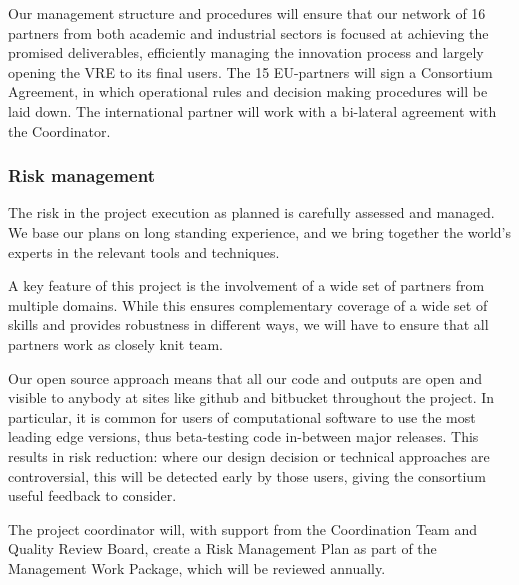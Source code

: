 Our management structure and procedures will ensure that our network
of 16 partners from both academic and industrial sectors is focused at
achieving the promised deliverables, efficiently managing the
innovation process and largely opening the VRE to its final users. The
15 EU-partners will sign a Consortium Agreement, in which operational
rules and decision making procedures will be laid down. The
international partner will work with a bi-lateral agreement with the
Coordinator.







\subsubsection{Risk management}

The risk in the project execution as planned is carefully assessed and
managed. We base our plans on long standing experience, and we bring
together the world's experts in the relevant tools and techniques.

A key feature of this project is the involvement of a wide set of
partners from multiple domains. While this ensures complementary
coverage of a wide set of skills and provides robustness in different
ways, we will have to ensure that all partners work as closely knit
team. 

Our open source approach means that all our code and outputs
are open and visible to anybody at sites like github and bitbucket
throughout the project. In particular, it is common for users of
computational software to use the most leading edge versions, thus
beta-testing code in-between major releases. This results in risk
reduction: where our design decision or technical approaches are
controversial, this will be detected early by those users, giving the
consortium useful feedback to consider.

The project coordinator will, with support from the Coordination Team
and Quality Review Board, create a Risk Management Plan
 as part of the Management Work Package,
which will be reviewed annually.

